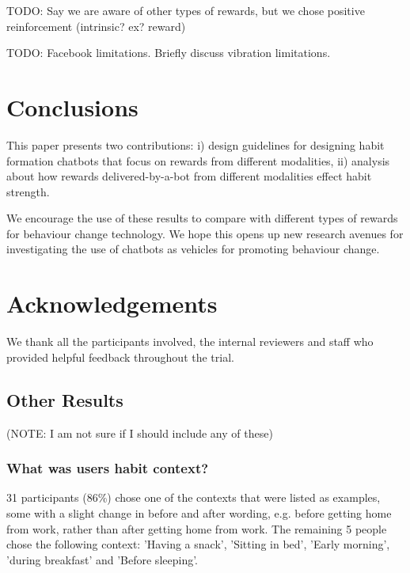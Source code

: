 \documentclass{scaffold/sigchi}
\begin{document}
TODO: Say we are aware of other types of rewards, but we chose positive reinforcement (intrinsic? ex? reward)

TODO: Facebook limitations. Briefly discuss vibration limitations.





\section{Conclusions}


This paper presents two contributions: i) design guidelines for designing habit formation chatbots that focus on rewards from different modalities, ii) analysis about how rewards delivered-by-a-bot from different modalities effect habit strength.

We encourage the use of these results to compare with different types of rewards for behaviour change technology. We hope this opens up new research avenues for investigating the use of chatbots as vehicles for promoting behaviour change.


\section{Acknowledgements}
We thank all the participants involved, the internal reviewers and staff who provided helpful feedback throughout the trial.


\subsection{Other Results}
(NOTE: I am not sure if I should include any of these)

\subsubsection{What was users habit context?}
31 participants (86\%) chose one of the contexts that were listed as examples, some with a slight change in before and after wording, e.g. before getting home from work, rather than after getting home from work. The remaining 5 people chose the following context: 'Having a snack', 'Sitting in bed', 'Early morning', 'during breakfast' and 'Before sleeping'.
\end{document}
